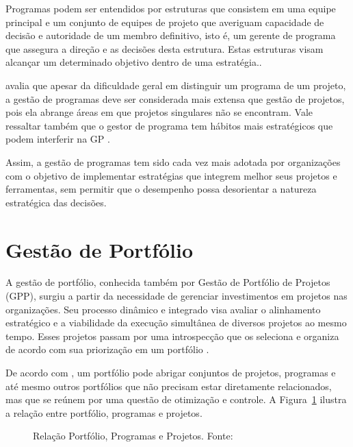 Programas podem ser entendidos por estruturas que consistem em uma equipe principal e um conjunto de equipes de projeto que averiguam capacidade de decisão e autoridade de um membro definitivo, isto é, um gerente de programa que assegura a direção e as decisões desta estrutura. Estas estruturas visam alcançar um determinado objetivo dentro de uma estratégia.\cite{brown2008handbook}.

 avalia que apesar da dificuldade geral em distinguir um programa de um projeto, a gestão de programas deve ser considerada mais extensa que gestão de projetos, pois ela abrange áreas em que projetos singulares não se encontram. Vale ressaltar também que o gestor de programa tem hábitos mais estratégicos que podem interferir na GP \cite{lycett2004289}.

Assim, a gestão de programas tem sido cada vez mais adotada por organizações com o objetivo de implementar estratégias que integrem melhor seus projetos e ferramentas, sem permitir que o desempenho possa desorientar a natureza estratégica das decisões.


\section{Gestão de Portfólio}

A gestão de portfólio, conhecida também por Gestão de Portfólio de Projetos (GPP), surgiu a partir da necessidade de gerenciar investimentos em projetos nas organizações. Seu processo dinâmico e integrado visa avaliar o alinhamento estratégico e a viabilidade da execução simultânea de diversos projetos ao mesmo tempo. Esses projetos passam por uma introspecção que os seleciona e organiza de acordo com sua priorização em um portfólio \cite{meredith2011project, kerzner2013project}.

De acordo com , um portfólio pode abrigar conjuntos de projetos, programas e até mesmo outros portfólios que não precisam estar diretamente relacionados, mas que se reúnem por uma questão de otimização e controle. A Figura~\ref{port_prog_proj} ilustra a relação entre portfólio, programas e projetos.

\begin{figure}[ht]
  \centering
  \caption{Relação Portfólio, Programas e Projetos. Fonte: \cite{pmi2006}}
  \label{port_prog_proj}
\end{figure}

